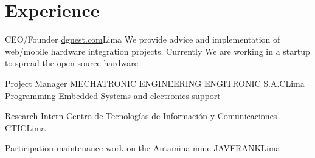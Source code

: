 \section{Experience}

{CEO/Founder}
{\href{http://dgnest.com}{dgnest.com}}{Lima}
{We provide advice and implementation of web/mobile hardware integration projects. Currently We are working in a startup to spread the open source hardware}
{} 

{Project Manager}
{MECHATRONIC ENGINEERING ENGITRONIC S.A.C}{Lima}
{Programming Embedded Systems and electronics support}
{} 

{Research Intern}
{Centro de Tecnologías de Información y Comunicaciones - CTIC}{Lima}
{}
{} 

{Participation maintenance work on the Antamina mine}
{JAVFRANK}{Lima}
{}
{}  